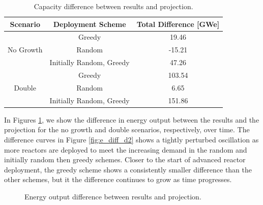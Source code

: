 \begin{table}[H]
    \centering
    \caption{Capacity difference between results and projection.}
    \label{tab:cap_diff}
    \begin{tabular}{c c c}
        \hline
        Scenario & Deployment Scheme & Total Difference [GWe]\\
        \hline
        \multirow{3}{*}{No Growth} & Greedy & 19.46 \\
        & Random & -15.21 \\
        & Initially Random, Greedy & 47.26 \\
        \hline
        \multirow{3}{*}{Double} & Greedy & 103.54 \\
        & Random & 6.65 \\
        & Initially Random, Greedy & 151.86 \\
        \hline
    \end{tabular}
\end{table}

In Figures \ref{fig:e_diff}, we show the difference in energy output between the results and the projection for the no growth and double scenarios, respectively, over time. The difference curves in Figure \ref{fig:e_diff_d2} shows a tightly perturbed oscillation as more reactors are deployed to meet the increasing demand in the random and initially random then greedy schemes. Closer to the start of advanced reactor deployment, the greedy scheme shows a consistently smaller difference than the other schemes, but it the difference continues to grow as time progresses.

\begin{figure}[H]
    \hfill
    \caption{Energy output difference between results and projection.}
    \label{fig:e_diff}
\end{figure}

